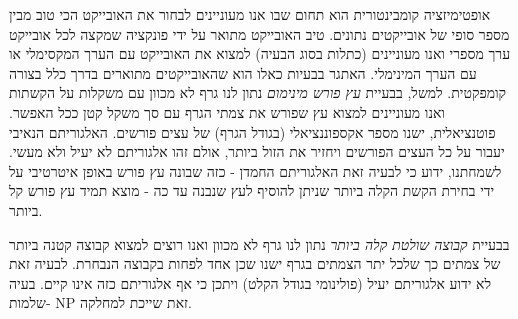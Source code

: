 \begin{hebrew}
אופטימיזציה קומבינטורית הוא תחום שבו אנו מעוניינים לבחור את האובייקט הכי טוב מבין מספר סופי של אובייקטים נתונים.
טיב האובייקט מתואר על ידי פונקציה שמקצה לכל אובייקט ערך מספרי ואנו מעוניינים (כתלות בסוג הבעיה) למצוא את האובייקט עם הערך המקסימלי או עם הערך המינימלי.
האתגר בבעיות כאלו הוא שהאובייקטים מתוארים בדרך כלל בצורה קומפקטית.  
למשל, בבעיית 
\emph{עץ פורש מינימום}
נתון לנו גרף לא מכוון עם משקלות על הקשתות ואנו מעוניינים למצוא עץ שפורש את צמתי הגרף עם סך משקל קטן ככל האפשר.
פוטנציאלית, ישנו מספר אקספוננציאלי (בגודל הגרף) של עצים פורשים.
האלגוריתם הנאיבי יעבור על כל העצים הפורשים ויחזיר את הזול ביותר, אולם זהו אלגוריתם לא יעיל ולא מעשי.
לשמחתנו, ידוע כי לבעיה זאת האלגוריתם החמדן - כזה שבונה עץ פורש באופן איטרטיבי על ידי בחירת הקשת הקלה ביותר שניתן להוסיף לעץ שנבנה עד כה - מוצא תמיד עץ פורש קל ביותר.

בבעיית 
\emph{קבוצה שולטת קלה ביותר}
נתון לנו גרף לא מכוון ואנו רוצים למצוא קבוצה קטנה ביותר של צמתים כך שלכל יתר הצמתים בגרף ישנו שכן אחד לפחות בקבוצה הנבחרת.
לבעיה זאת לא ידוע אלגוריתם יעיל (פולינומי בגודל הקלט) ויתכן כי אף אלגוריתם כזה אינו קיים.
בעיה זאת שייכת למחלקה 
$\text{NP}$%
-שלמות.
\end{hebrew}
